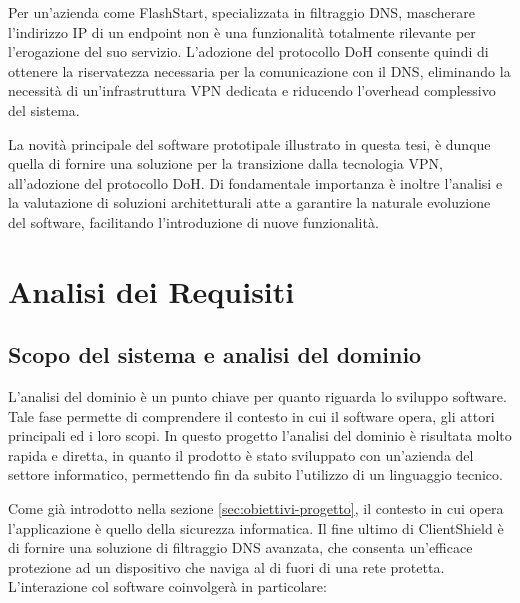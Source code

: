 \documentclass[12pt,a4paper,openright,twoside]{book}
\begin{document}
Per un'azienda come FlashStart, specializzata in filtraggio \gls{DNS}, mascherare l'indirizzo IP di un endpoint non è una funzionalità totalmente rilevante per l'erogazione del suo servizio.
L'adozione del protocollo \gls{DoH} consente quindi di ottenere la riservatezza necessaria per la comunicazione con il \gls{DNS}, eliminando la necessità di un'infrastruttura \gls{VPN} dedicata e riducendo l'overhead complessivo del sistema.

La novità principale del software prototipale illustrato in questa tesi, è dunque quella di fornire una soluzione per la transizione dalla tecnologia \gls{VPN}, all'adozione del protocollo \gls{DoH}.
Di fondamentale importanza è inoltre l'analisi e la valutazione di soluzioni architetturali atte a garantire la naturale evoluzione del software, facilitando l'introduzione di nuove funzionalità.

\chapter{Analisi dei Requisiti}
\label{chap:analisi-dei-requisiti}

\section{Scopo del sistema e analisi del dominio}

L'analisi del dominio è un punto chiave per quanto riguarda lo sviluppo software.
Tale fase permette di comprendere il contesto in cui il software opera, gli attori principali ed i loro scopi.
In questo progetto l'analisi del dominio è risultata molto rapida e diretta, in quanto il prodotto è stato sviluppato con un'azienda del settore informatico, permettendo fin da subito l'utilizzo di un linguaggio tecnico.

Come già introdotto nella sezione \ref{sec:obiettivi-progetto}, il contesto in cui opera l'applicazione è quello della sicurezza informatica.
Il fine ultimo di ClientShield è di fornire una soluzione di filtraggio \gls{DNS} avanzata, che consenta un'efficace protezione ad un dispositivo che naviga al di fuori di una rete protetta.
L'interazione col software coinvolgerà in particolare:
\end{document}
